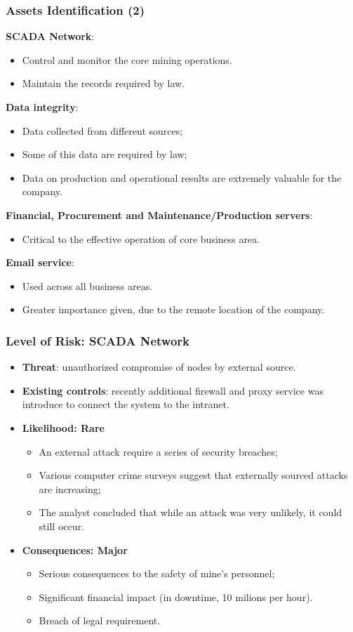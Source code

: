 \documentclass[xcolor ={table,usenames,dvipsnames}]{beamer}
\theoremstyle{definition}
\begin{document}
	\begin{frame}
		\frametitle{Assets Identification (2)}
		\textbf{SCADA Network}:
		\begin{itemize}
			\item Control and monitor the core mining operations.
			\item Maintain the records required by law.
		\end{itemize}
		\textbf{Data integrity}:
		\begin{itemize}
			\item Data collected from different sources;
			\item Some of this data are required by law;
			\item Data on production and operational results are extremely valuable for the company.
		\end{itemize}
		\textbf{Financial, Procurement and Maintenance/Production servers}:
		\begin{itemize}
			\item Critical to the effective operation of core business area.
		\end{itemize}
		\textbf{Email service}:
		\begin{itemize}
			\item Used across all business areas.
			\item Greater importance given, due to the remote location of the company. 
		\end{itemize}
	\end{frame}

	\begin{frame}
		\frametitle{Level of Risk: SCADA Network}
		\begin{itemize}
			\item \textbf{Threat}: unauthorized compromise of nodes by external source.
			\item \textbf{Existing controls}: recently additional firewall and proxy service was introduce to connect the system to the intranet.
			\item \textbf{Likelihood: Rare}
			\begin{itemize}
				\item An external attack require a series of security breaches;
				\item Various computer crime surveys suggest that externally sourced attacks are increasing;
				\item The analyst concluded that while an attack was
				very unlikely, it could still occur.
			\end{itemize}
			\item \textbf{Consequences: Major}
			\begin{itemize}
				\item Serious consequences to the safety of mine's personnel;
				\item Significant financial impact (in downtime, 10 milions per hour).
				\item Breach of legal requirement.
			\end{itemize}
		\end{itemize}
	\end{frame}
	
\end{document}
